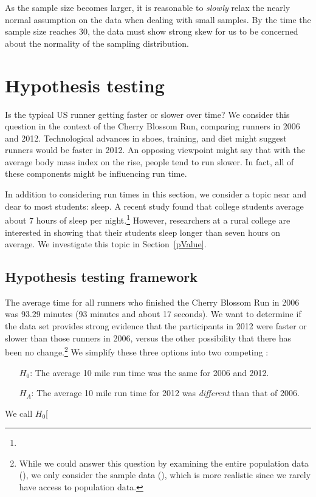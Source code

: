\begin{tipBox}{
As the sample size becomes larger, it is reasonable to \emph{slowly} relax the nearly normal assumption on the data when dealing with small samples. By the time the sample size reaches 30, the data must show strong skew for us to be concerned about the normality of the sampling distribution.}
\end{tipBox}


\section{Hypothesis testing}
\label{hypothesisTesting}


Is the typical US runner getting faster or slower over time? We consider this question in the context of the Cherry Blossom Run, comparing runners in 2006 and 2012. Technological advances in shoes, training, and diet might suggest runners would be faster in 2012. An opposing viewpoint might say that with the average body mass index on the rise, people tend to run slower. In fact, all of these components might be influencing run time.

In addition to considering run times in this section, we consider a topic near and dear to most students: sleep. A recent study found that college students average about 7 hours of sleep per night.\footnote{} However, researchers at a rural college are interested in showing that their students sleep longer than seven hours on average. We investigate this topic in Section~\ref{pValue}.

\subsection{Hypothesis testing framework}

The average time for all runners who finished the Cherry Blossom Run in 2006 was 93.29 minutes (93 minutes and about 17 seconds). We want to determine if the  data set provides strong evidence that the participants in 2012 were faster or slower than those runners in 2006, versus the other possibility that there has been no change.\footnote{While we could answer this question by examining the entire population data (), we only consider the sample data (), which is more realistic since we rarely have access to population data.} We simplify these three options into two competing :
\begin{itemize}
\setlength{\itemsep}{0mm}
\item[$H_0$:] The average 10 mile run time was the same for 2006 and 2012.
\item[$H_A$:] The average 10 mile run time for 2012 was \emph{different} than that of 2006.
\end{itemize}
We call $H_0$\marginpar[\raggedright\vspace{6mm}

